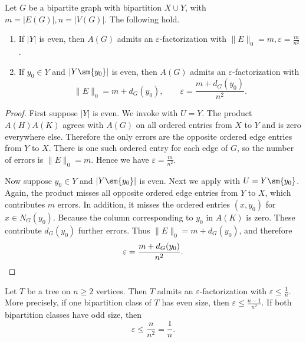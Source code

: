 \documentclass{file}
\newcommand{\eps}{\varepsilon}
\begin{document}
\begin{cor}
\label{cor:bipartite-one-sided-errors}
Let $G$ be a bipartite graph with bipartition $X\cup Y$, with $m=|E(G)|, n=|V(G)|$.
The following hold.
\begin{enumerate}
  \item If $|Y|$ is even, then $A(G)$ admits an $\eps$-factorization with $\|E\|_0=m,\eps=\frac{m}{n^2}$.

  \item If $y_0\in Y$ and $|Y\sm  \{y_0\}|$ is even, then $A(G)$ admits an
  $\eps$-factorization with
  \[
    \|E\|_0=m+d_G(y_0),
    \qquad
    \eps=\frac{m+d_G(y_0)}{n^2}.
  \]
\end{enumerate}
\end{cor}

\begin{proof}
First suppose $|Y|$ is even.  
We invoke  with $U=Y$.
The product $A(H)A(K)$ agrees with $A(G)$ on all ordered entries from $X$ to $Y$ and is zero everywhere else.  
Therefore the only errors are the opposite
ordered edge entries from $Y$ to $X$.  
There is one such ordered entry for each edge of $G$, so the number of errors is $\|E\|_0=m$.
Hence we have  $\eps=\frac{m}{n^2}$.

Now suppose $y_0\in Y$ and $|Y\sm \{y_0\}|$ is even.  
Next we apply  with $U=Y\sm  \{y_0\}$.
Again, the product misses all opposite ordered edge entries from $Y$ to $X$,
which contributes $m$ errors.  
In addition, it misses the ordered entries $(x,y_0)$ for $x\in N_G(y_0)$.
Because the column corresponding to $y_0$ in $A(K)$ is zero.  
These contribute $d_G(y_0)$ further errors.  
Thus $\|E\|_0=m+d_G(y_0)$,
and therefore
\[
  \eps=\frac{m+d_G(y_0)}{n^2}.\qedhere
\]
\end{proof}



\begin{thm}
\label{thm:trees-eps}
Let $T$ be a tree on $n\ge 2$ vertices.  
Then $T$ admits an $\eps$-factorization with
$\eps\le \frac{1}{n}$.
More precisely, if one bipartition class of $T$ has even size, then $\eps\le \frac{n-1}{n^2}$.
If both bipartition classes have odd size, then
\[
  \eps\le \frac{n}{n^2}=\frac{1}{n}.
\]
\end{thm}
\end{document}
